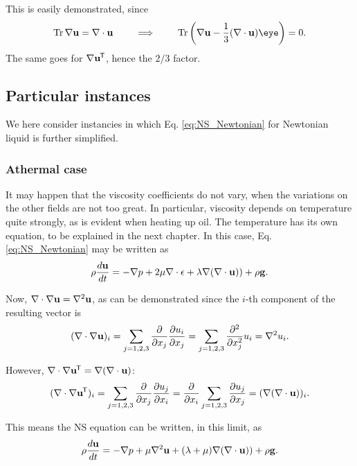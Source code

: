 This is easily demonstrated, since
\[
  \Tr  \nabla\bfu = \divu \qquad\implies\qquad \Tr \left( \nabla\bfu -\frac13 (\divu) \eye \right) = 0 .
\]
The same goes for $ \nabla\mathbf{u}^{\mkern-1.5mu\mathsf{T}}$, hence the $2/3$ factor.


\subsection{Particular instances}

We here consider instancies in which Eq. \ref{eq:NS_Newtonian} for
Newtonian liquid is further simplified.


\subsubsection{Athermal case}

It may happen that the viscosity coefficients do not vary, when the
variations on the other fields are not too great. In particular,
viscosity depends on temperature quite strongly, as is evident when
heating up oil. The temperature has its own equation, to be explained
in the next chapter. In this case, Eq. \ref{eq:NS_Newtonian} may be
written as
\begin{equation*}
  \rho \frac{d\mathbf{u} }{dt} =
  - \nabla p +
   2 \mu \nabla \cdot  \epsilon
  + \lambda \nabla ( \nabla\cdot\mathbf{u} ) )
  + \rho \mathbf{g} .
\end{equation*}

Now, $\nabla \cdot  \nabla\mathbf{u} = \nabla^2 \mathbf{u}$, as can be demonstrated
since the $i$-th component of the resulting vector is
\[
(\nabla \cdot \nabla\mathbf{u} )_i =
\sum_{j=1,2,3} 
\frac{\partial}{\partial x_j} 
\frac{\partial u_i}{\partial x_j}
=
\sum_{j=1,2,3} 
\frac{\partial^2 }{\partial x_j^2} 
u_i = \nabla^2 u_i .
\]

However, $\nabla \cdot  \nabla\mathbf{u}^{\mkern-1.5mu\mathsf{T}} = \nabla  (\nabla\cdot\mathbf{u})$:
\[
(\nabla \cdot \nabla\mathbf{u}^{\mkern-1.5mu\mathsf{T}} )_i =
\sum_{j=1,2,3} 
\frac{\partial}{\partial x_j} 
\frac{\partial u_j}{\partial x_i}
=
\frac{\partial}{\partial x_i} 
\sum_{j=1,2,3} 
\frac{\partial u_j }{\partial x_j} 
= (\nabla  (\nabla\cdot\mathbf{u}))_i .
\]

This means the NS equation can be written, in this limit,
as
\begin{equation}
  \label{eq:NS_const_viscs}
  \rho \frac{d\mathbf{u} }{dt} =
  - \nabla p +
   \mu \nabla^2  \mathbf{u}
  + ( \lambda  + \mu) \nabla ( \nabla\cdot\mathbf{u} ) )
  + \rho \mathbf{g} .
\end{equation}





